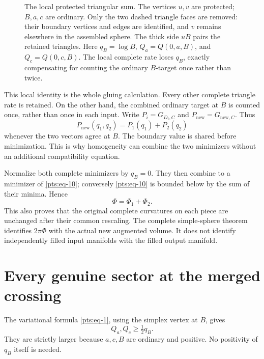 \begin{figure}[htbp]
\centering

\caption{The local protected triangular sum. The vertices \(u,v\) are
protected; \(B,a,c\) are ordinary. Only the two dashed triangle faces
are removed: their boundary vertices and edges are identified, and
\(v\) remains elsewhere in the assembled sphere. The thick side
\(uB\) pairs the retained triangles. Here \(q_B=\log B\),
\(Q_a=Q(0,a,B)\), and \(Q_c=Q(0,c,B)\). The local complete rate
loses \(q_B\), exactly compensating for counting the ordinary
\(B\)-target once rather than twice.}
\label{fig:protected-triangular-sum}
\end{figure}

This local identity is the whole gluing calculation. Every other
complete triangle rate is retained. On the other hand,
the combined ordinary target at \(B\) is counted once, rather than once
in each input. Write \(P_i=G_{D_i,C}\) and
\(P_{\mathrm{new}}=G_{\mathrm{new},C}\). Thus \begin{equation}\label{pts:eq-10}
P_{\mathrm{new}}(q_1,q_2)
                   =P_1(q_1)+P_2(q_2)
\end{equation} whenever the two vectors agree at \(B\). The boundary value is
shared before minimization. This is why homogeneity can combine the
two minimizers without an additional compatibility equation.

Normalize both complete minimizers by \(q_B=0\). They then combine to a
minimizer of \eqref{pts:eq-10}; conversely \eqref{pts:eq-10} is bounded below by the sum of their
minima. Hence \begin{equation}\label{pts:eq-11}
\Phi=\Phi_1+\Phi_2.
\end{equation} This also proves that the original complete curvatures on each piece
are unchanged after their common rescaling. The complete simple-sphere
theorem identifies \(2\pi\Phi\) with the actual new augmented volume. It
does not identify independently filled input manifolds with the filled
output manifold.

\section{Every genuine sector at the merged
crossing}\label{pts:sec-4}

The variational formula \eqref{pts:eq-1}, using the simplex vertex at \(B\), gives \begin{equation}\label{pts:eq-12}
Q_a,Q_c\ge\tfrac12q_B.
\end{equation} They are strictly larger because \(a,c,B\) are ordinary and positive.
No positivity of \(q_B\) itself is needed.

